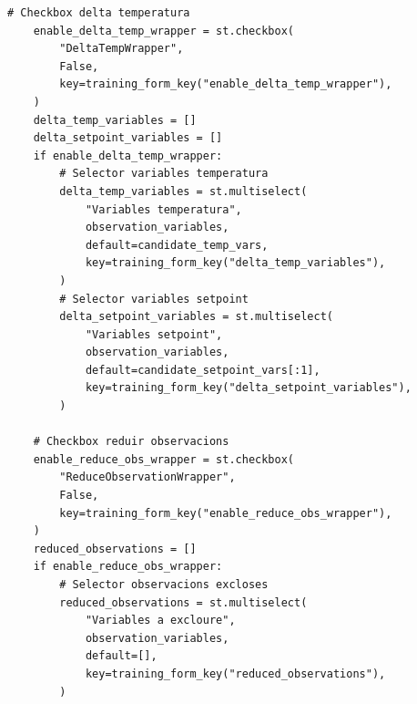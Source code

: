 \documentclass[10pt,a4paper]{article}
\begin{document}
\begin{lstlisting}[style=studioPython,caption={page\_components/training\_wrappers.py},label={lst:page-components-training-wrappers-py}]
    # Checkbox delta temperatura
    enable_delta_temp_wrapper = st.checkbox(
        "DeltaTempWrapper",
        False,
        key=training_form_key("enable_delta_temp_wrapper"),
    )
    delta_temp_variables = []
    delta_setpoint_variables = []
    if enable_delta_temp_wrapper:
        # Selector variables temperatura
        delta_temp_variables = st.multiselect(
            "Variables temperatura",
            observation_variables,
            default=candidate_temp_vars,
            key=training_form_key("delta_temp_variables"),
        )
        # Selector variables setpoint
        delta_setpoint_variables = st.multiselect(
            "Variables setpoint",
            observation_variables,
            default=candidate_setpoint_vars[:1],
            key=training_form_key("delta_setpoint_variables"),
        )

    # Checkbox reduir observacions
    enable_reduce_obs_wrapper = st.checkbox(
        "ReduceObservationWrapper",
        False,
        key=training_form_key("enable_reduce_obs_wrapper"),
    )
    reduced_observations = []
    if enable_reduce_obs_wrapper:
        # Selector observacions excloses
        reduced_observations = st.multiselect(
            "Variables a excloure",
            observation_variables,
            default=[],
            key=training_form_key("reduced_observations"),
        )


\end{lstlisting}
\end{document}
